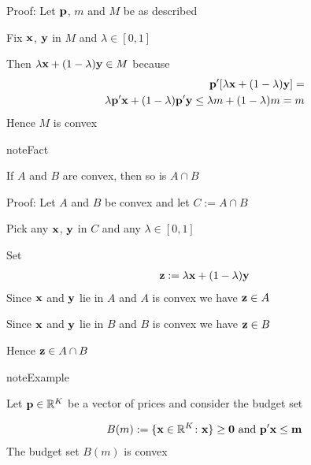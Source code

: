 \documentclass[letterpaper,10pt,english]{jupyterBook}
\begin{document}
\sphinxAtStartPar
Proof: Let \({\bf p}\), \(m\) and \(M\) be as described

\sphinxAtStartPar
Fix \({\bf x}\), \({\bf y}\) in \(M\) and \(\lambda \in [0, 1]\)

\sphinxAtStartPar
Then \(\lambda {\bf x} + (1 - \lambda) {\bf y} \in M\) because
\begin{equation*}
\begin{split}
%
{\bf p}'[\lambda {\bf x} + (1 - \lambda) {\bf y} ] =
\\
\lambda {\bf p}'{\bf x} + (1 - \lambda) {\bf p}'{\bf y} 
\leq \lambda m + (1 - \lambda) m
= m
%
\end{split}
\end{equation*}
\sphinxAtStartPar
Hence \(M\) is convex

\begin{sphinxadmonition}{note}{Fact}

\sphinxAtStartPar
If \(A\) and \(B\) are convex, then so is \(A \cap B\)
\end{sphinxadmonition}

\sphinxAtStartPar
Proof: Let \(A\) and \(B\) be convex and let \(C := A \cap B\)

\sphinxAtStartPar
Pick any \({\bf x}\), \({\bf y}\) in \(C\) and any \(\lambda \in [0, 1]\)

\sphinxAtStartPar
Set
\begin{equation*}
\begin{split}{\bf z} := \lambda {\bf x} + (1 - \lambda) {\bf y}\end{split}
\end{equation*}
\sphinxAtStartPar
Since \({\bf x}\) and \({\bf y}\) lie in \(A\) and \(A\) is convex we have \({\bf z}
\in A\)

\sphinxAtStartPar
Since \({\bf x}\) and \({\bf y}\) lie in \(B\) and \(B\) is convex we have \({\bf z}
\in B\)

\sphinxAtStartPar
Hence \({\bf z} \in A \cap B\)

\begin{sphinxadmonition}{note}{Example}

\sphinxAtStartPar
Let \({\bf p} \in \mathbb{R}^K\) be a vector of prices and consider the budget set
\end{sphinxadmonition}
\begin{equation*}
\begin{split}
%
B(m) := \{ {\bf x} \in \mathbb{R}^K \colon {\bf x \} \geq {\bf 0} \text{ and }
{\bf p}' {\bf x} \leq m}
%
\end{split}
\end{equation*}
\sphinxAtStartPar
The budget set \(B(m)\) is convex
\end{document}

